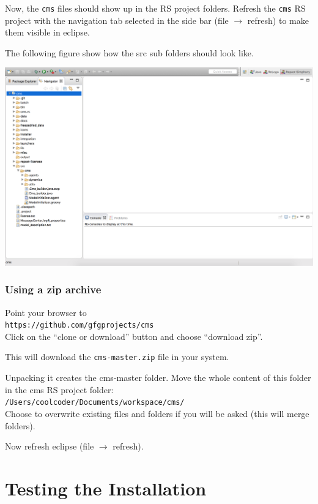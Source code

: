 \documentclass{article}
\begin{document}
Now, the \verb+cms+ files should show up in the RS project folders.
Refresh the \verb+cms+ RS project with the navigation tab selected in the side bar (file $\rightarrow$ refresh) to make them visible in eclipse.

The following figure show how the src sub folders should look like.

\vskip2mm
\noindent
\includegraphics[scale=0.35]{fig_cms_rs_navigation1}

\vskip2mm

\subsubsection{Using a zip archive}

Point your browser to\\ 
\verb+https://github.com/gfgprojects/cms+\\
Click on the ``clone or download'' button and choose ``download zip''.

This will download the \verb+cms-master.zip+ file in your system.

Unpacking it creates the cms-master folder.
Move the whole content of this folder in the cms RS project folder:\\  
\verb+/Users/coolcoder/Documents/workspace/cms/+\\
Choose to overwrite existing files and folders if you will be asked (this will merge folders). 

Now refresh eclipse (file $\rightarrow$ refresh).



\section{Testing the Installation}
\end{document}
